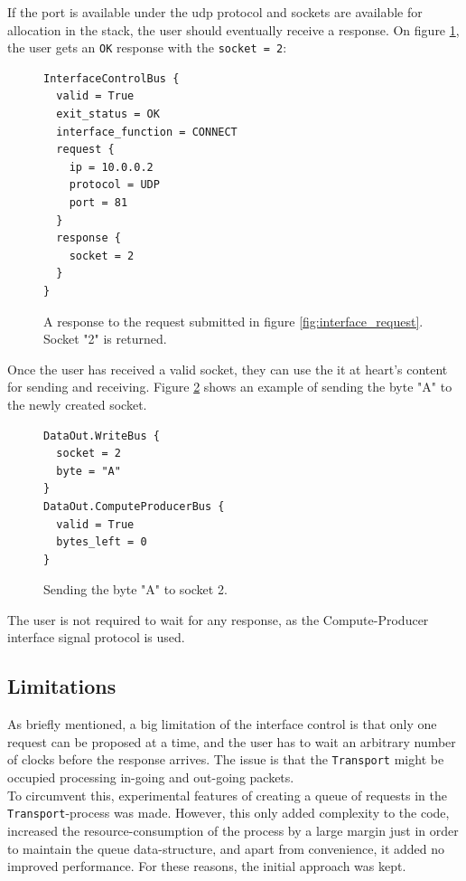 If the port is available under the \gls{udp} protocol and sockets are available
for allocation in the stack, the user should eventually receive a response.
On figure \ref{fig:interface_response}, the user gets an \texttt{OK} response with the \texttt{socket = 2}:
\begin{figure}
	\centering
\begin{Verbatim}[frame=single,samepage=true]
InterfaceControlBus {
  valid = True
  exit_status = OK
  interface_function = CONNECT
  request {
    ip = 10.0.0.2
    protocol = UDP
    port = 81
  }
  response {
    socket = 2
  }
}
\end{Verbatim}
	\caption{A response to the request submitted in figure
	\ref{fig:interface_request}. Socket "2" is returned.}
	\label{fig:interface_response}
\end{figure}
Once the user has received a valid socket, they can use the it at heart's
content for sending and receiving. Figure \ref{fig:interface_send_byte} shows
an example of sending the byte "A" to the newly created socket.
\begin{figure}
	\centering
\begin{Verbatim}[frame=single,samepage=true]
DataOut.WriteBus {
  socket = 2
  byte = "A"
}
DataOut.ComputeProducerBus {
  valid = True
  bytes_left = 0
}
\end{Verbatim}
	\caption{Sending the byte "A" to socket 2.}
	\label{fig:interface_send_byte}
\end{figure}
The user is not required to wait for any response, as the Compute-Producer
interface signal protocol is used.


\subsection{Limitations}
As briefly mentioned, a big limitation of the interface control is that only
one request can be proposed at a time, and the user has to wait an arbitrary
number of clocks before the response arrives. The issue is that the
\texttt{Transport} might be occupied processing in-going and out-going
packets.\\
To circumvent this, experimental features of creating a queue of requests in
the \texttt{Transport}-process was made. However, this only added complexity to
the code, increased the resource-consumption of the process by a large margin
just in order to maintain the queue data-structure, and apart from convenience,
it added no improved performance. For these reasons, the initial approach was
kept.












